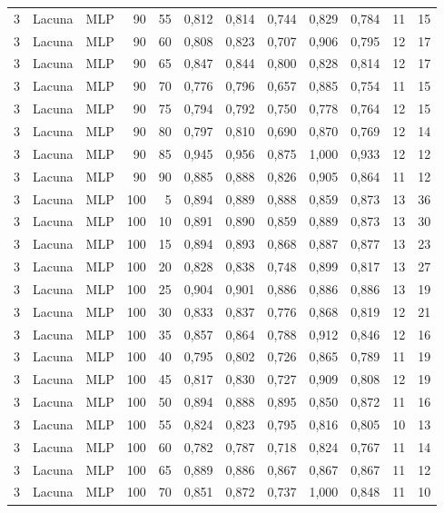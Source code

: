 \begin{longtable}{@{}rllrrrrrrrrr@{}}
3 & Lacuna & MLP & 90 & 55 & 0,812 & 0,814 & 0,744 & 0,829 & 0,784 & 11 & 15 \\
3 & Lacuna & MLP & 90 & 60 & 0,808 & 0,823 & 0,707 & 0,906 & 0,795 & 12 & 17 \\
3 & Lacuna & MLP & 90 & 65 & 0,847 & 0,844 & 0,800 & 0,828 & 0,814 & 12 & 17 \\
3 & Lacuna & MLP & 90 & 70 & 0,776 & 0,796 & 0,657 & 0,885 & 0,754 & 11 & 15 \\
3 & Lacuna & MLP & 90 & 75 & 0,794 & 0,792 & 0,750 & 0,778 & 0,764 & 12 & 15 \\
3 & Lacuna & MLP & 90 & 80 & 0,797 & 0,810 & 0,690 & 0,870 & 0,769 & 12 & 14 \\
3 & Lacuna & MLP & 90 & 85 & 0,945 & 0,956 & 0,875 & 1,000 & 0,933 & 12 & 12 \\
3 & Lacuna & MLP & 90 & 90 & 0,885 & 0,888 & 0,826 & 0,905 & 0,864 & 11 & 12 \\
3 & Lacuna & MLP & 100 & 5 & 0,894 & 0,889 & 0,888 & 0,859 & 0,873 & 13 & 36 \\
3 & Lacuna & MLP & 100 & 10 & 0,891 & 0,890 & 0,859 & 0,889 & 0,873 & 13 & 30 \\
3 & Lacuna & MLP & 100 & 15 & 0,894 & 0,893 & 0,868 & 0,887 & 0,877 & 13 & 23 \\
3 & Lacuna & MLP & 100 & 20 & 0,828 & 0,838 & 0,748 & 0,899 & 0,817 & 13 & 27 \\
3 & Lacuna & MLP & 100 & 25 & 0,904 & 0,901 & 0,886 & 0,886 & 0,886 & 13 & 19 \\
3 & Lacuna & MLP & 100 & 30 & 0,833 & 0,837 & 0,776 & 0,868 & 0,819 & 12 & 21 \\
3 & Lacuna & MLP & 100 & 35 & 0,857 & 0,864 & 0,788 & 0,912 & 0,846 & 12 & 16 \\
3 & Lacuna & MLP & 100 & 40 & 0,795 & 0,802 & 0,726 & 0,865 & 0,789 & 11 & 19 \\
3 & Lacuna & MLP & 100 & 45 & 0,817 & 0,830 & 0,727 & 0,909 & 0,808 & 12 & 19 \\
3 & Lacuna & MLP & 100 & 50 & 0,894 & 0,888 & 0,895 & 0,850 & 0,872 & 11 & 16 \\
3 & Lacuna & MLP & 100 & 55 & 0,824 & 0,823 & 0,795 & 0,816 & 0,805 & 10 & 13 \\
3 & Lacuna & MLP & 100 & 60 & 0,782 & 0,787 & 0,718 & 0,824 & 0,767 & 11 & 14 \\
3 & Lacuna & MLP & 100 & 65 & 0,889 & 0,886 & 0,867 & 0,867 & 0,867 & 11 & 12 \\
3 & Lacuna & MLP & 100 & 70 & 0,851 & 0,872 & 0,737 & 1,000 & 0,848 & 11 & 10 \\

\end{longtable}
